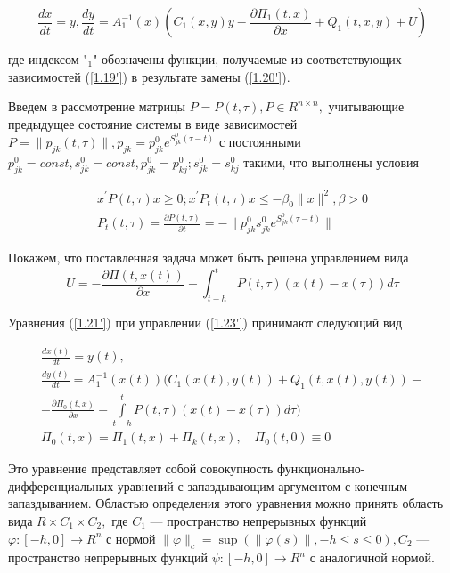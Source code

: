 \begin{equation} \label{1.21'}
\frac{dx}{dt} = y, \frac{dy}{dt} = A^{-1}_1(x) (C_1(x, y) y - \frac{\partial \Pi_1 (t, x)}{\partial x} + Q_1 (t, x, y) + U)
\end{equation}

где индексом "$_1$" обозначены функции, получаемые из соответствующих зависимостей (\ref{1.19'}) в результате замены (\ref{1.20'}).

Введем в рассмотрение матрицы $P = P(t, \tau), P \in R^{n \times n},$ учитывающие предыдущее состояние системы в виде зависимостей $P = \| p_{jk} (t, \tau) \|, p_{jk} = p_{jk}^0 e^{S_{jk}^0 (\tau - t)}$ с постоянными $p_{jk}^0 = const, s_{jk}^0 = const, p_{jk}^0 = p_{kj}^0; s_{jk}^0 = s_{kj}^0$ такими, что выполнены условия


\begin{equation} \label{1.22'}
	\begin{array}{c}
		x^{'} P (t, \tau) x \ge 0; x^{'} P_t (t, \tau) x \le - \beta_0 \| x \|^2, \beta > 0\\
		P_t(t, \tau) = \frac{\partial P (t, \tau)}{\partial t} = - \| p_{jk}^0 s_{jk}^{0} e^{S_{jk}^0 (\tau - t)} \|
	\end{array}
\end{equation}

Покажем, что поставленная задача может быть решена управлением вида
\begin{equation} \label{1.23'}
U = - \frac{\partial \Pi (t, x(t))}{\partial x} - \int_{t - h}^{t} P(t, \tau) (x(t) - x(\tau)) d \tau
\end{equation}

Уравнения (\ref{1.21'}) при управлении (\ref{1.23'}) принимают следующий вид

\begin{equation} \label{1.24'}
\begin{array}{c}
\frac{d x(t)}{dt}=y(t),\\
\frac{d y(t)}{dt} = A_1^{-1} (x(t)) (C_1(x(t), y(t)) + Q_1(t, x(t), y(t)) -\\- \frac{\partial \Pi_0 (t, x)}{\partial x} - \int \limits_{t - h}^{t} P(t, \tau) (x(t) - x(\tau)) d \tau)\\
\Pi_0 (t, x) = \Pi_1(t, x) + \Pi_k (t, x), \quad \Pi_0 (t, 0) \equiv 0
\end{array}
\end{equation}

Это уравнение представляет собой совокупность функционально-дифференциальных уравнений с запаздывающим аргументом с конечным запаздыванием. Областью определения этого уравнения можно принять область вида $R \times C_1 \times C_2,$ где $C_1$ --- пространство непрерывных функций $\varphi : [-h, 0] \to R^n$ с нормой $\| \varphi \|_c = \sup (\| \varphi(s) \|, -h \le s \le 0), C_2$ --- пространство непрерывных функций $\psi : [-h, 0] \to R^n$ с аналогичной нормой.

